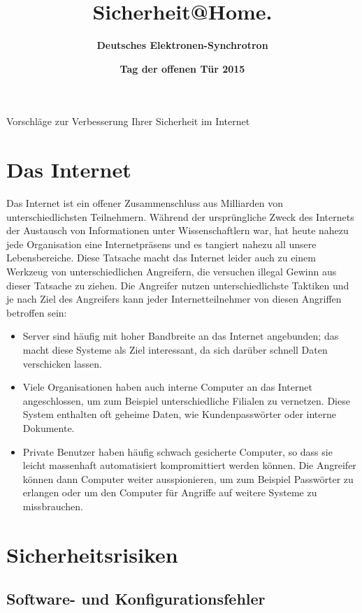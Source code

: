 \documentclass[10pt,foldmark,tumble]{leaflet}
\title{\textcolor{DESYBlue}{\bf Sicherheit@Home}\textcolor{DESYOrange}{\bf.}}
\author{%
\Large \textcolor{DESYBlue}{\bf Deutsches Elektronen-Synchrotron}
}
\date{\textcolor{DESYOrange}{\bf Tag der offenen Tür 2015}}
\begin{document}
\maketitle

Vorschläge zur Verbesserung Ihrer Sicherheit im Internet

\newpage

\section{Das Internet}

Das Internet ist ein offener Zusammenschluss aus Milliarden von unterschiedlichsten
Teilnehmern. Während der ursprüngliche Zweck des Internets der Austausch von Informationen
unter Wissenschaftlern war, hat heute nahezu jede Organisation eine Internetpräsens und
es tangiert nahezu all unsere Lebensbereiche. Diese Tatsache macht das Internet leider auch
zu einem Werkzeug von unterschiedlichen Angreifern, die versuchen illegal Gewinn aus dieser
Tatsache zu ziehen.
Die Angreifer nutzen unterschiedlichste Taktiken und je nach Ziel des Angreifers kann jeder
Internetteilnehmer von diesen Angriffen betroffen sein:

\begin{itemize}
 \item Server sind häufig mit hoher Bandbreite an das Internet angebunden; das 
 macht diese Systeme als Ziel interessant, da sich darüber schnell Daten verschicken lassen.
 \item Viele Organisationen haben auch interne Computer an das Internet angeschlossen, um 
 zum Beispiel unterschiedliche Filialen zu vernetzen. Diese System enthalten oft geheime Daten, 
 wie Kundenpasswörter oder interne Dokumente.
 \item Private Benutzer haben häufig schwach gesicherte Computer, so dass sie leicht massenhaft
 automatisiert kompromittiert werden können. Die Angreifer können dann Computer weiter ausspionieren, 
 um zum Beispiel Passwörter zu erlangen oder um den Computer für Angriffe auf weitere Systeme 
 zu missbrauchen.
\end{itemize}

\section{Sicherheitsrisiken}

\subsection{Software- und Konfigurationsfehler}
\end{document}

